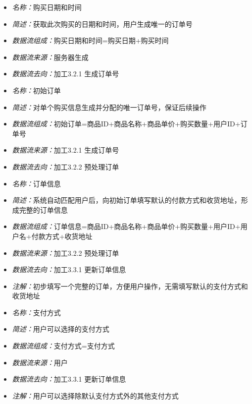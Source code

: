 \vspace{-1mm}

\begin{itemize}
	\item \textit{名称：}购买日期和时间
	\item \textit{简述：}获取此次购买的日期和时间，用户生成唯一的订单号
	\item \textit{数据流组成：}购买日期和时间=购买日期+购买时间
	\item \textit{数据流来源：}服务器生成
	\item \textit{数据流去向：}加工3.2.1 生成订单号
\end{itemize}

\vspace{-1mm}

\begin{itemize}
	\item \textit{名称：}初始订单
	\item \textit{简述：}对单个购买信息生成并分配的唯一订单号，保证后续操作
	\item \textit{数据流组成：}初始订单=商品ID+商品名称+商品单价+购买数量+用户ID+订单号
	\item \textit{数据流来源：}加工3.2.1 生成订单号
	\item \textit{数据流去向：}加工3.2.2 预处理订单
\end{itemize}

\vspace{-1mm}

\begin{itemize}
	\item \textit{名称：}订单信息
	\item \textit{简述：}系统自动匹配用户后，向初始订单填写默认的付款方式和收货地址，形成完整的订单信息
	\item \textit{数据流组成：}订单信息=商品ID+商品名称+商品单价+购买数量+用户ID+用户名+付款方式+收货地址
	\item \textit{数据流来源：}加工3.2.2 预处理订单
	\item \textit{数据流去向：}加工3.3.1 更新订单信息
	\item \textit{注解：}初步填写一个完整的订单，方便用户操作，无需填写默认的支付方式和收货地址
\end{itemize}

\vspace{-1mm}

\begin{itemize}
	\item \textit{名称：}支付方式
	\item \textit{简述：}用户可以选择的支付方式
	\item \textit{数据流组成：}支付方式=支付方式
	\item \textit{数据流来源：}用户
	\item \textit{数据流去向：}加工3.3.1 更新订单信息
	\item \textit{注解：}用户可以选择除默认支付方式外的其他支付方式
\end{itemize}

